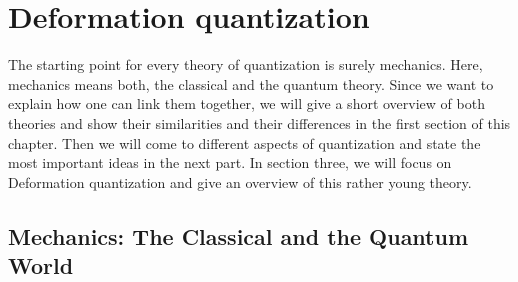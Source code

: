 
%
%

\chapter{Deformation quantization}

The starting point for every theory of quantization is surely mechanics. Here, 
mechanics means both, the classical and the quantum theory. Since we want to 
explain how one can link them together, we will give a short overview of both 
theories and show their similarities and their differences in the first section 
of this chapter. Then we will come to different aspects of quantization and 
state the most important ideas in the next part. In section three, we will 
focus on Deformation quantization and give an overview of this rather young 
theory.



\section{Mechanics: The Classical and the Quantum World}
\label{sec:chap2_Mechanics}

